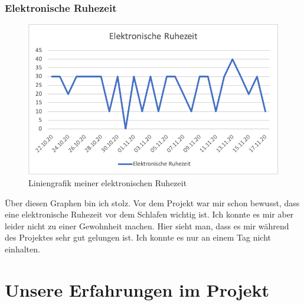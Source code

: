 \subsubsection{Elektronische Ruhezeit}
\begin{figure}[!ht]
  \centering
  \includegraphics[width=0.6\linewidth]{./images/ruhezeit_jonas.png}
  \caption{Liniengrafik meiner elektronischen Ruhezeit}
  \label{fig:ruhezeit_jonas}
\end{figure}
Über diesen Graphen bin ich stolz. Vor dem Projekt war mir schon bewusst, dass eine elektronische Ruhezeit vor dem Schlafen wichtig ist. Ich konnte es mir aber leider nicht zu einer Gewohnheit machen. Hier sieht man, dass es mir während des Projektes sehr gut gelungen ist. Ich konnte es nur an einem Tag nicht einhalten.
\section{Unsere Erfahrungen im Projekt}
